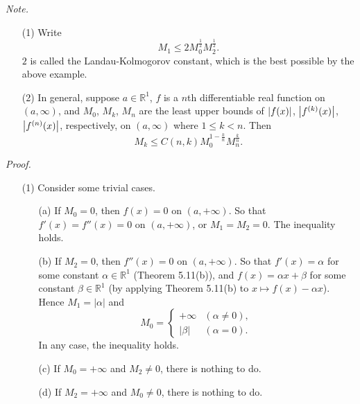 \documentclass{article}
\begin{document}
\emph{Note.}
\begin{enumerate}
\item[(1)]
Write
\[
  M_1 \leq 2 M_0^{\frac{1}{2}} M_2^{\frac{1}{2}}.
\]
$2$ is called the Landau-Kolmogorov constant,
which is the best possible by the above example.

\item[(2)]
In general,
suppose $a \in \mathbb{R}^1$,
$f$ is a $n$th differentiable real function on $(a,\infty)$,
and $M_0$, $M_k$, $M_n$ are the least upper bounds of
$\abs{ f(x) }$, $\abs{ f^{(k)}(x) }$, $\abs{ f^{(n)}(x) }$, respectively, on $(a,\infty)$
where $1 \leq k < n$.
Then
\[
  M_k \leq C(n,k) M_0^{1 - \frac{k}{n}} M_n^{\frac{k}{n}}.
\]
\end{enumerate}



\emph{Proof.}
\begin{enumerate}
\item[(1)]
  Consider some trivial cases.
  \begin{enumerate}
  \item[(a)]
  If $M_0 = 0$, then $f(x) = 0$ on $(a,+\infty)$.
  So that $f'(x) = f''(x) = 0$ on $(a,+\infty)$, or $M_1 = M_2 = 0$.
  The inequality holds.

  \item[(b)]
  If $M_2 = 0$, then $f''(x) = 0$ on $(a,+\infty)$.
  So that $f'(x) = \alpha$ for some constant $\alpha \in \mathbb{R}^1$ (Theorem 5.11(b)),
  and $f(x) = \alpha x + \beta$ for some constant $\beta \in \mathbb{R}^1$
  (by applying Theorem 5.11(b) to $x \mapsto f(x) - \alpha x$).
  Hence $M_1 = |\alpha|$ and
  \begin{equation*}
  M_0 =
    \begin{cases}
      +\infty & (\alpha \neq 0), \\
      |\beta| & (\alpha = 0).
    \end{cases}
  \end{equation*}
  In any case, the inequality holds.

  \item[(c)]
  If $M_0 = +\infty$ and $M_2 \neq 0$, there is nothing to do.

  \item[(d)]
  If $M_2 = +\infty$ and $M_0 \neq 0$, there is nothing to do.
  \end{enumerate}


\end{enumerate}
\end{document}
